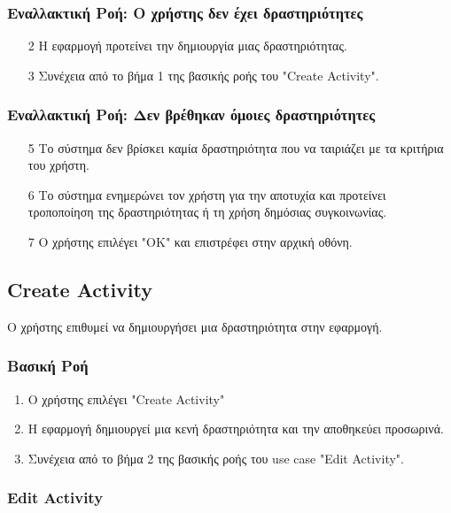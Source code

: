 \subsubsection{Εναλλακτική Ροή: Ο χρήστης δεν έχει δραστηριότητες}

\begin{enumerate}
    \item[2] Η εφαρμογή προτείνει την δημιουργία μιας δραστηριότητας.
    \item[3] Συνέχεια από το βήμα 1 της βασικής ροής του "Create Activity".
\end{enumerate}

\subsubsection{Εναλλακτική Ροή: Δεν βρέθηκαν όμοιες δραστηριότητες}

\begin{enumerate}
    \item[5] Το σύστημα δεν βρίσκει καμία δραστηριότητα που να ταιριάζει με τα
        κριτήρια του χρήστη.
    \item[6] Το σύστημα ενημερώνει τον χρήστη για την αποτυχία και προτείνει
        τροποποίηση της δραστηριότητας ή τη χρήση δημόσιας συγκοινωνίας.
    \item[7] Ο χρήστης επιλέγει "ΟΚ" και επιστρέφει στην αρχική οθόνη.
\end{enumerate}


\subsection{Create Activity}

Ο χρήστης επιθυμεί να δημιουργήσει μια δραστηριότητα στην εφαρμογή.

\subsubsection{Βασική Ροή}

\begin{enumerate}
    \item Ο χρήστης επιλέγει "Create Activity"
    \item Η εφαρμογή δημιουργεί μια κενή δραστηριότητα και την αποθηκεύει
          προσωρινά.
    \item Συνέχεια από το βήμα 2 της βασικής ροής του use case "Edit Activity".
\end{enumerate}


\subsubsection{Edit Activity}

